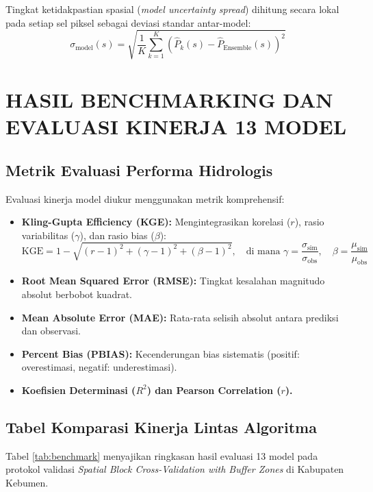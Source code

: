 \documentclass[11pt,a4paper]{article}
\begin{document}
Tingkat ketidakpastian spasial (\textit{model uncertainty spread}) dihitung secara lokal pada setiap sel piksel sebagai deviasi standar antar-model:
\begin{equation}
    \sigma_{\text{model}}(s) = \sqrt{\frac{1}{K} \sum_{k=1}^K \left( \hat{P}_k(s) - \hat{P}_{\text{Ensemble}}(s) \right)^2}
\end{equation}

\section{HASIL BENCHMARKING DAN EVALUASI KINERJA 13 MODEL}

\subsection{Metrik Evaluasi Performa Hidrologis}
Evaluasi kinerja model diukur menggunakan metrik komprehensif:
\begin{itemize}
    \item \textbf{Kling-Gupta Efficiency (KGE):} Mengintegrasikan korelasi ($r$), rasio variabilitas ($\gamma$), dan rasio bias ($\beta$):
    \begin{equation}
        \text{KGE} = 1 - \sqrt{(r - 1)^2 + (\gamma - 1)^2 + (\beta - 1)^2}, \quad \text{di mana } \gamma = \frac{\sigma_{\text{sim}}}{\sigma_{\text{obs}}}, \quad \beta = \frac{\mu_{\text{sim}}}{\mu_{\text{obs}}}
    \end{equation}
    \item \textbf{Root Mean Squared Error (RMSE):} Tingkat kesalahan magnitudo absolut berbobot kuadrat.
    \item \textbf{Mean Absolute Error (MAE):} Rata-rata selisih absolut antara prediksi dan observasi.
    \item \textbf{Percent Bias (PBIAS):} Kecenderungan bias sistematis (positif: overestimasi, negatif: underestimasi).
    \item \textbf{Koefisien Determinasi ($R^2$) dan Pearson Correlation ($r$).}
\end{itemize}

\subsection{Tabel Komparasi Kinerja Lintas Algoritma}
Tabel \ref{tab:benchmark} menyajikan ringkasan hasil evaluasi 13 model pada protokol validasi \textit{Spatial Block Cross-Validation with Buffer Zones} di Kabupaten Kebumen.
\end{document}
